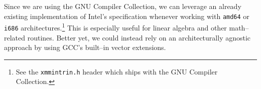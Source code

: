 Since we are using the GNU Compiler Collection, we can leverage an already existing implementation of Intel's specification whenever working with {\tt amd64} or {\tt i686} architectures.\footnote{See the {\tt xmmintrin.h} header which ships with the GNU Compiler Collection.} This is especially useful for linear algebra and other math--related routines. Better yet, we could instead rely on an architecturally agnostic approach by using GCC's built--in vector extensions.

